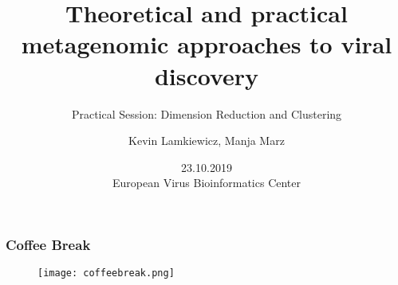 

\title{Theoretical and practical metagenomic approaches to viral discovery}
\subtitle{Practical Session: Dimension Reduction and Clustering}
\author{Kevin Lamkiewicz, Manja Marz}
\date{23.10.2019\\[1em]European Virus Bioinformatics Center}



\begin{frame}
  \maketitle
\end{frame}

\beginbackup

\begin{frame}[c]\frametitle{Coffee Break}
  \begin{figure}[htbp]
    \centering
    \texttt{[image: coffeebreak.png]}
  \end{figure}
\end{frame}

\backupend

